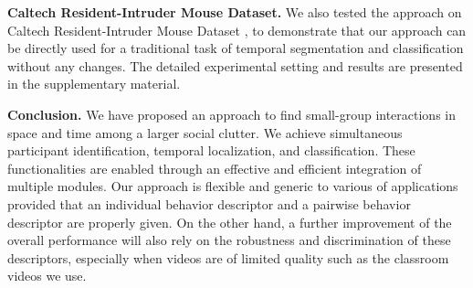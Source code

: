 \vspace{0.05in}

\noindent\textbf{Caltech Resident-Intruder Mouse Dataset.} We also tested the approach on Caltech Resident-Intruder Mouse Dataset \cite{CRIM13}, to demonstrate that our approach can be directly used for a traditional task of temporal segmentation and classification without any changes. The detailed experimental setting and results are presented in the supplementary material.


\vspace{0.05in}

\noindent\textbf{Conclusion.} We have proposed an approach to find small-group interactions in space and time among a larger social clutter. We achieve simultaneous participant identification, temporal localization, and classification. These functionalities are enabled through an effective and efficient integration of multiple modules. Our approach is flexible and generic to various of applications provided that an individual behavior descriptor and a pairwise behavior descriptor are properly given. On the other hand, a further improvement of the overall performance will also rely on the robustness and discrimination of these descriptors, especially when videos are of limited quality such as the classroom videos we use. 
